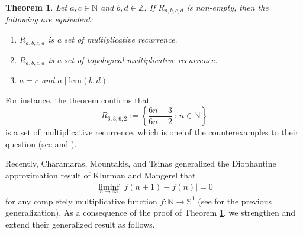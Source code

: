 \documentclass[12pt, reqno, a4paper]{amsart}
\newtheorem{theorem}{Theorem}[section]
\theoremstyle{definition}
\theoremstyle{remark}
\numberwithin{equation}{section}
\renewcommand{\leq}{\leqslant}
\renewcommand{\geq}{\geqslant}
\renewcommand{\epsilon}{\varepsilon}
\begin{document}
\begin{theorem} \label{thm:main}
Let \( a, c \in \mathbb{N} \) and \( b, d \in \mathbb{Z} \). 
If \( R_{a,b,c,d}\) is non-empty, then the following are equivalent:
\begin{enumerate}[label=\textnormal{(\roman*)}]
\item $R_{a,b,c,d}$ is a set of multiplicative recurrence.
\item $R_{a,b,c,d}$ is a set of topological multiplicative recurrence.
\item \( a = c \) and \( a \mid \mathrm{lcm}(b, d) \).
\end{enumerate}
\end{theorem}

For instance, the theorem confirms that 
\[
R_{6,3,6,2} := \left\{ \frac{6n + 3}{6n + 2} \,:\, n \in \mathbb{N} \right\} 
\]
is a set of multiplicative recurrence, which is one of the counterexamples to their question
 (see \cite[p.~759]{MR4594405} and \cite[p.~1]{charamaras2024multiplicativerecurrencelinearpatterns}). 

Recently, %
Charamaras, Mountakis, and Tsinas \cite[Theorem 1.1]{charamaras2024multiplicativerecurrencelinearpatterns} generalized 
the Diophantine approximation result of Klurman and Mangerel \cite[Theorem~1.1]{MR3856825} that
\begin{align*}
\liminf_{n \to \infty} |f(n+1)-f(n)|=0
\end{align*}
for any completely multiplicative function $f: \mathbb{N} \to \mathbb{S}^1$ (see \cite[Corollary 1.7]{MR4594405} for the previous generalization). As a consequence of the proof of Theorem \ref{thm:main}, we strengthen and extend their generalized result as follows.

\end{document}
